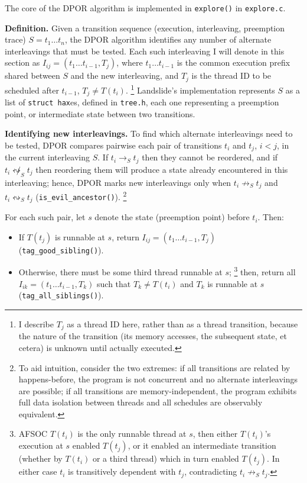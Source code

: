The core of the DPOR algorithm is implemented in {\tt explore()} in {\tt explore.c}.

{\bf Definition.}
Given a transition sequence (execution, interleaving, preemption trace) $S = t_1 \dots t_n$,
the DPOR algorithm identifies any number of alternate interleavings that must be tested.
Each such interleaving I will denote in this section as $I_{ij} = (t_1 \dots t_{i-1}, T_j)$,
where $t_1 \dots t_{i-1}$ is the common execution prefix shared between $S$ and the new interleaving,
and $T_j$ is the thread ID to be scheduled after $t_{i-1}$, $T_j \ne T(t_i)$.
\footnote{I describe $T_j$ as a thread ID here, rather than as a thread transition,
because the nature of the transition (its memory accesses, the subsequent state, et cetera)
is unknown until actually executed.}
Landslide's implementation represents $S$ as a list of {\tt struct hax}es, defined in {\tt tree.h},
each one representing a preemption point, or intermediate state between two transitions.

{\bf Identifying new interleavings.}
To find which alternate interleavings need to be tested,
DPOR compares pairwise each pair of transitions $t_i$ and $t_j$, $i<j$, in the current interleaving $S$.
If $t_i \rightarrow_S t_j$ then they cannot be reordered,
and if $t_i \not\leftrightsquigarrow_S t_j$ then reordering them
will produce a state already encountered in this interleaving;
hence, DPOR marks new interleavings only
when $t_i \not\rightarrow_S t_j$ and $t_i \leftrightsquigarrow_S t_j$
({\tt is\_evil\_ancestor()}).
\footnote{To aid intuition, consider the two extremes:
if all transitions are related by happens-before,
the program is not concurrent and no alternate interleavings are possible;
if all transitions are memory-independent,
the program exhibits full data isolation between threads and all schedules are observably equivalent.}

For each such pair, let $s$ denote the state (preemption point) before $t_i$.
Then:
\begin{itemize}
	\item If $T(t_j)$ is runnable at $s$, return $I_{ij} = (t_1 \dots t_{i-1}, T_j)$ ({\tt tag\_good\_sibling()}).
	\item Otherwise, there must be some third thread runnable at $s$;%
		\footnote{AFSOC $T(t_i)$ is the only runnable thread at $s$,
		then either $T(t_i)$'s execution at $s$ enabled $T(t_j)$,
		or it enabled an intermediate transition
		(whether by $T(t_i)$ or a third thread)
		which in turn enabled $T(t_j)$.
		In either case $t_i$ is transitively dependent with $t_j$, contradicting $t_i \not\rightarrow_S t_j$.}
		then, return all $I_{ik} = (t_1 \dots t_{i-1}, T_k)$ such that
		$T_k \ne T(t_i)$ and $T_k$ is runnable at $s$
		({\tt tag\_all\_siblings()}).
\end{itemize}

